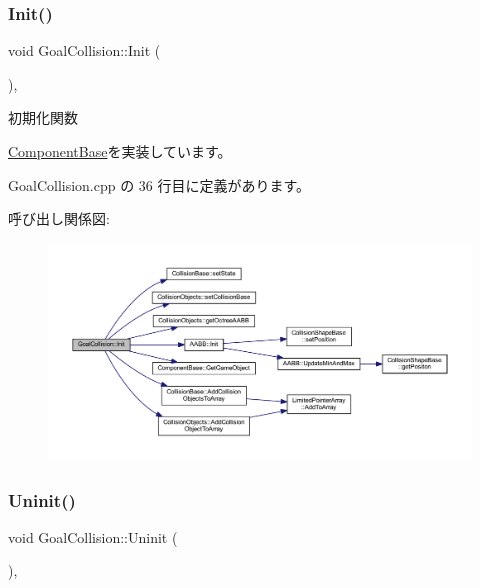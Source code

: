 \subsubsection{\texorpdfstring{Init()}{Init()}}
{\footnotesize\ttfamily void Goal\+Collision\+::\+Init (\begin{DoxyParamCaption}{ }\end{DoxyParamCaption})\hspace{0.3cm}{\ttfamily [override]}, {\ttfamily [virtual]}}



初期化関数 



\mbox{\hyperlink{class_component_base_a125939d6befe42f28886a6523e86b18b}{Component\+Base}}を実装しています。



 Goal\+Collision.\+cpp の 36 行目に定義があります。

呼び出し関係図\+:\nopagebreak
\begin{figure}[H]
\begin{center}
\leavevmode
\includegraphics[width=350pt]{class_goal_collision_ab6089638f5390e019a55ae11952e1cf9_cgraph}
\end{center}
\end{figure}
\mbox{\label{class_goal_collision_ab818bad44ffcd595f1c495e659c0b348}} 
\subsubsection{\texorpdfstring{Uninit()}{Uninit()}}
{\footnotesize\ttfamily void Goal\+Collision\+::\+Uninit (\begin{DoxyParamCaption}{ }\end{DoxyParamCaption})\hspace{0.3cm}{\ttfamily [override]}, {\ttfamily [virtual]}}



